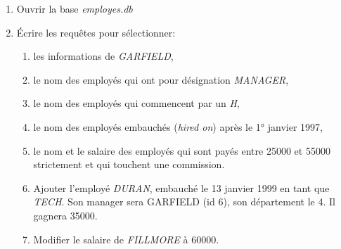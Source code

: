 \documentclass[a4paper,11pt]{article}
\begin{document}
\begin{Form}
\begin{exo}
\begin{enumerate}
\begin{enumerate}
\end{enumerate} 
\end{enumerate}
\end{exo}
\begin{exo}
\begin{enumerate}
\item Ouvrir la base \emph{employes.db}
\item Écrire les requêtes pour sélectionner:
\begin{enumerate}
\item les informations de \emph{GARFIELD},
\item le nom des employés qui ont pour désignation \emph{MANAGER},
\item le nom des employés qui commencent par un \emph{H},
\item le nom des employés embauchés (\emph{hired on}) après le 1° janvier 1997,
\item le nom et le salaire des employés qui sont payés entre 25000 et 55000 strictement et qui touchent une commission.
\item Ajouter l'employé \emph{DURAN}, embauché le 13 janvier 1999 en tant que \emph{TECH}. Son manager sera GARFIELD (id 6), son département le 4. Il gagnera 35000.
\item Modifier le salaire de \emph{FILLMORE} à 60000.
\end{enumerate} 
\end{enumerate}
\end{exo}
\end{Form}
\end{document}
